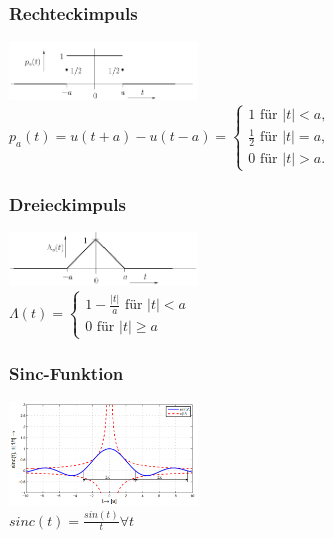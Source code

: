 \begin{multicols}{2}
  \subsubsection*{Rechteckimpuls}
  \includegraphics[width=5cm]{include/Wichtige Funktionen/img/Rechteckimpuls.png}
  \footnotesize
  \\ $p_a(t) = u(t+a)-u(t-a)= \begin{cases}
      1 \textrm{ für } |t| < a,           \\
      \frac{1}{2} \textrm{ für } |t| = a, \\
      0 \textrm{ für } |t| > a.
    \end{cases} $                               \\
  \subsubsection*{Dreieckimpuls}
  \includegraphics[width=5cm]{include/Wichtige Funktionen/img/Dreieckimpuls.png}
  \footnotesize
  \\ $\Lambda(t) = \begin{cases}
      1 - \frac{|t|}{a} \textrm{ für } |t| < a \\
      0 \textrm{ für } |t| \geq a
    \end{cases}$                                      \\
  \subsubsection*{Sinc-Funktion}
  \includegraphics[width=5cm]{include/Wichtige Funktionen/img/SincFunktion.png}
  \footnotesize
  \\ $sinc(t) = \frac{sin(t)}{t} \forall t$                                                                                   \\
\end{multicols}
